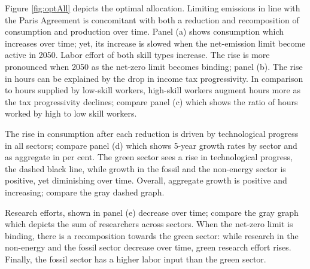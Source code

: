 Figure \ref{fig:optAll} depicts the optimal allocation. Limiting emissions in line with the Paris Agreement is concomitant with both a reduction and recomposition of consumption and production over time. 
Panel (a) shows consumption which increases over time; yet, its increase is slowed when the net-emission limit become active in  2050. Labor effort of both skill types increase. The rise is more pronounced when 2050 as the net-zero limit becomes binding; panel (b). The rise in hours can be explained by the drop in income tax progressivity. In comparison to hours supplied by low-skill workers, high-skill workers augment hours more as the tax progressivity declines; compare panel (c) which shows the ratio of hours worked by high to low skill workers. 

The rise in consumption after each reduction is driven by technological progress in all sectors; compare panel (d) which shows 5-year growth rates by sector and as aggregate in per cent. 
The green sector sees a rise in technological progress, the dashed black line, while growth in the fossil and the non-energy sector is positive, yet diminishing over time. Overall, aggregate growth is positive and increasing; compare the gray dashed graph. 

Research efforts, shown in panel (e) decrease over time; compare the gray graph which depicts the sum of researchers across sectors. When the net-zero limit is binding, there is a recomposition towards the green sector: while research in the non-energy and the fossil sector decrease over time, green research effort rises. 
Finally, the fossil sector has a higher labor input than the green sector. 

